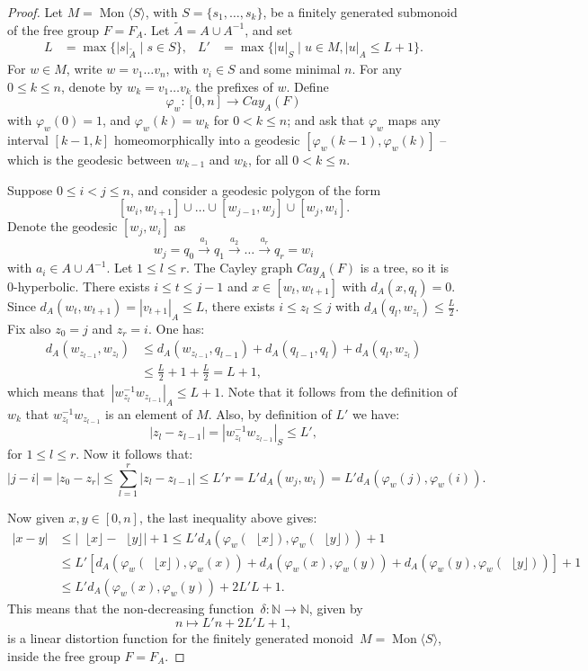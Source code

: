 \documentclass[11pt]{amsart}
\newcommand{\Mgen}[1]{\operatorname{Mon}\bigl\langle #1 \bigr\rangle}
\newcommand{\floor}[1]{\operatorname{}\lfloor #1 \rfloor}
\newcommand{\N}{\mathbb{N}}
\theoremstyle{plain}
\theoremstyle{definition}
\begin{document}
\begin{proof}
Let $M = \Mgen{S}$, with $S = \{s_1, \ldots, s_k\}$, be a finitely generated submonoid of the free group $F = F_A$.
Let $\tilde{A} = A \cup A^{-1}$, and 
set 
\begin{align*}
L & = \max\{|s|_{\tilde{A}} \mid s \in S\}, & 
L' & = \max\{|u|_S \mid u \in M, |u|_A \leq L + 1\}.
\end{align*}
For $w \in M$, write $w = v_1 \ldots v_n$, with $v_i \in S$ and some minimal $n$. For any~$0 \leq k \leq n$, denote by $w_k = v_1\ldots v_k$ the prefixes of $w$. Define
\[
\varphi_w \colon [0, n] \rightarrow Cay_A(F)
\]
with $\varphi_w(0) = 1$, and $\varphi_w(k) = w_k$ for $0 < k \leq n$; and ask that $\varphi_w$ maps any interval $[k-1, k]$ homeomorphically into a geodesic $[\varphi_w(k-1), \varphi_w(k)]$ -- which is the geodesic between $w_{k-1}$ and $w_k$, for all $0 < k \leq n$.

Suppose $0 \leq i < j \leq n$, and consider a geodesic polygon of the form 
\[
[w_i, w_{i+1}] \cup \ldots \cup [w_{j-1}, w_{j}] \cup [w_j, w_i].
\]
Denote the geodesic $[w_j, w_i]$ as 
\[
w_j = q_0 \xrightarrow{a_1} q_1 \xrightarrow{a_2} \dots \xrightarrow{a_r} q_r = w_i
\]
with $a_i \in A \cup A^{-1}$. Let $1 \leq l \leq r$. The Cayley graph $Cay_A(F)$ is a tree, so it is 0-hyperbolic.
There exists $i \leq t \leq j-1$ and $x \in [w_t, w_{t+1}]$ with $d_A(x, q_l) = 0$. Since $d_A(w_t, w_{t+1}) = |v_{t+1}|_A \leq L$, there exists $i \leq z_l \leq j$ with $d_A(q_l, w_{z_l}) \leq \frac{L}{2}$. Fix also $z_0 = j$ and $z_r = i$. One has:
\begin{align*}
d_A(w_{z_{l-1}}, w_{z_l}) & \leq d_A(w_{z_{l-1}}, q_{l-1}) + d_A(q_{l-1}, q_l) + d_A(q_l, w_{z_l}) \\
& \leq \frac{L}{2} + 1 + \frac{L}{2} = L + 1,
\end{align*}
which means that~$|w_{z_l}^{-1} w_{z_{l-1}}|_A \leq L+1$. Note that it follows from the definition of $w_k$ that $w_{z_l}^{-1} w_{z_{l-1}}$ is an element of $M$. Also, by definition of $L'$ we have:
\[
|z_l - z_{l-1}| = |w_{z_l}^{-1} w_{z_{l-1}}|_S \leq L',
\]
for $1 \leq l \leq r$. Now it follows that:
\[
|j - i| =|z_0 - z_r| \leq \sum_{l=1}^{r} |z_l - z_{l-1}| \leq L'r = L' d_A(w_j, w_i) = L' d_A(\varphi_w(j), \varphi_w(i)).
\]


Now given $x, y \in [0, n]$, the last inequality above gives:
\begin{align*}
|x - y| & \leq |\floor x - \floor y| + 1 \leq L' d_A(\varphi_w(\floor x ), \varphi_w(\floor y )) + 1\\
& \leq L' \left[
d_A(\varphi_w(\floor x ), \varphi_w(x)) +
d_A(\varphi_w(x), \varphi_w(y)) + 
d_A(\varphi_w(y), \varphi_w(\floor y ))
\right] + 1 \\
& \leq L'd_A(\varphi_w(x), \varphi_w(y)) + 2L'L + 1.
\end{align*}
This means that the non-decreasing function~$\delta \colon \N \rightarrow \N$, given by 
\[
n \mapsto L'n + 2L'L + 1,
\]
is a linear distortion function for the finitely generated monoid~$M = \Mgen{S}$, inside the free group $F = F_A$.
\end{proof}
\end{document}
